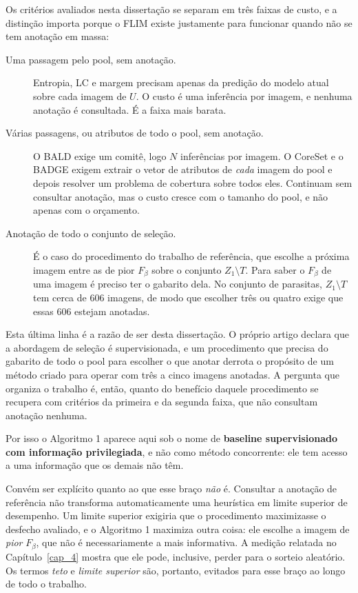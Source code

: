 Os critérios avaliados nesta dissertação se separam em três faixas de custo, e a distinção importa porque o \ac{FLIM} existe justamente para funcionar quando não se tem anotação em massa:

\begin{description}
    \item[Uma passagem pelo pool, sem anotação.] Entropia, \ac{LC} e margem precisam apenas da predição do modelo atual sobre cada imagem de $U$. O custo é uma inferência por imagem, e nenhuma anotação é consultada. É a faixa mais barata.

    \item[Várias passagens, ou atributos de todo o pool, sem anotação.] O \ac{BALD} exige um comitê, logo $N$ inferências por imagem. O CoreSet e o \ac{BADGE} exigem extrair o vetor de atributos de \emph{cada} imagem do pool e depois resolver um problema de cobertura sobre todos eles. Continuam sem consultar anotação, mas o custo cresce com o tamanho do pool, e não apenas com o orçamento.

    \item[Anotação de todo o conjunto de seleção.] É o caso do procedimento do trabalho de referência, que escolhe a próxima imagem entre as de pior $F_\beta$ sobre o conjunto $Z_1 \setminus T$. Para saber o $F_\beta$ de uma imagem é preciso ter o gabarito dela. No conjunto de parasitas, $Z_1 \setminus T$ tem cerca de 606 imagens, de modo que escolher três ou quatro exige que essas 606 estejam anotadas.
\end{description}

Esta última linha é a razão de ser desta dissertação. O próprio artigo declara que a abordagem de seleção é supervisionada, e um procedimento que precisa do gabarito de todo o pool para escolher o que anotar derrota o propósito de um método criado para operar com três a cinco imagens anotadas. A pergunta que organiza o trabalho é, então, quanto do benefício daquele procedimento se recupera com critérios da primeira e da segunda faixa, que não consultam anotação nenhuma.

Por isso o Algoritmo 1 aparece aqui sob o nome de \textbf{baseline supervisionado com informação privilegiada}, e não como método concorrente: ele tem acesso a uma informação que os demais não têm.

Convém ser explícito quanto ao que esse braço \emph{não} é. Consultar a anotação de referência não transforma automaticamente uma heurística em limite superior de desempenho. Um limite superior exigiria que o procedimento maximizasse o desfecho avaliado, e o Algoritmo 1 maximiza outra coisa: ele escolhe a imagem de \emph{pior} $F_\beta$, que não é necessariamente a mais informativa. A medição relatada no Capítulo~\ref{cap_4} mostra que ele pode, inclusive, perder para o sorteio aleatório. Os termos \emph{teto} e \emph{limite superior} são, portanto, evitados para esse braço ao longo de todo o trabalho.

